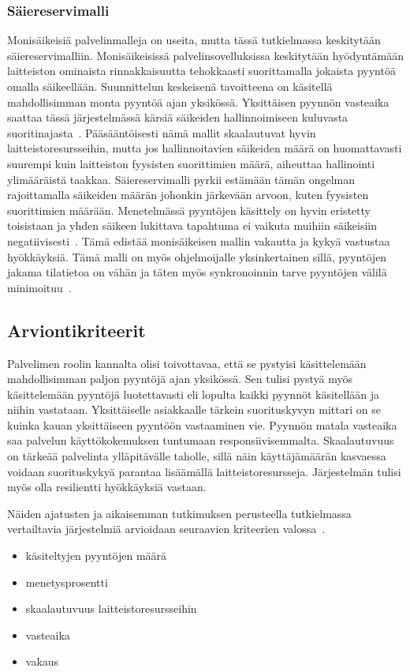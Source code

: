 \documentclass[12pt]{article}
\begin{document}
\subsubsection{Säiereservimalli}
Monisäikeisiä palvelinmalleja on useita, mutta tässä tutkielmassa keskitytään säiereservimalliin.
Monisäikeisissä palvelinsovelluksissa keskitytään hyödyntämään laitteiston ominaista
rinnakkaisuutta tehokkaasti suorittamalla jokaista pyyntöä omalla säikeellään. Suunnittelun keskeisenä
tavoitteena on käsitellä mahdollisimman monta pyyntöä ajan yksikössä. Yksittäisen pyynnön
vasteaika saattaa tässä
järjestelmässä kärsiä säikeiden hallinnoimiseen kuluvasta suoritinajasta~\cite{easton_developing_2004}.
Pääsääntöisesti nämä mallit skaalautuvat hyvin laitteistoresursseihin,
mutta jos hallinnoitavien säikeiden määrä on huomattavasti suurempi kuin laitteiston
fyysisten suorittimien määrä, aiheuttaa hallinointi ylimääräistä taakkaa.
Säiereservimalli pyrkii estämään tämän ongelman rajoittamalla
säikeiden määrän johonkin järkevään arvoon, kuten fyysisten suorittimien
määrään.
Menetelmässä pyyntöjen käsittely on hyvin eristetty toisistaan ja
yhden säikeen lukittava tapahtuma ei vaikuta muihiin säikeisiin negatiivisesti~\cite{davis_case_2017}.
Tämä edistää monisäikeisen mallin vakautta ja kykyä vastustaa hyökkäyksiä.
Tämä malli on myös ohjelmoijalle yksinkertainen sillä, pyyntöjen jakama tilatietoa
on vähän ja täten myös synkronoinnin tarve pyyntöjen välilä minimoituu~\cite{hu_applying_1998}.



\subsection{ Arviontikriteerit }
Palvelimen roolin kannalta olisi toivottavaa, että
se pystyisi käsittelemään mahdollisimman paljon pyyntöjä
ajan yksikössä. Sen tulisi pystyä myös käsittelemään pyyntöjä
luotettavasti eli lopulta kaikki pyynnöt käsitellään ja niihin vastataan.
Yksittäiselle asiakkaalle tärkein suorituskyvyn mittari on se kuinka kauan
yksittäiseen pyyntöön vastaaminen vie. Pyynnön matala vasteaika saa
palvelun käyttökokemuksen tuntumaan responsiivisemmalta.
Skaalautuvuus on tärkeää palvelinta ylläpitävälle taholle, sillä 
näin käyttäjämäärän kasvaessa voidaan suorituskykyä parantaa
lisäämällä laitteistoresursseja. Järjestelmän tulisi myös
olla resilientti hyökkäyksiä vastaan.

Näiden ajatusten ja aikaisemman tutkimuksen perusteella
tutkielmassa vertailtavia järjestelmiä arvioidaan seuraavien 
kriteerien valossa~\cite{gokhale_performance_2006}.
\begin{itemize}
    \item käsiteltyjen pyyntöjen määrä
    \item menetysprosentti
    \item skaalautuvuus laitteistoresursseihin
    \item vasteaika
    \item vakaus
\end{itemize}
\end{document}
